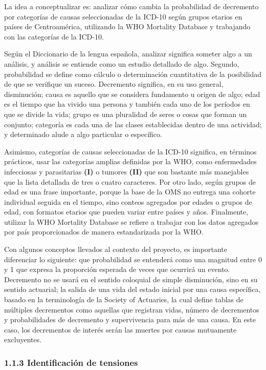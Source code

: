 \documentclass[
  letterpaper,
  DIV=11,
  numbers=noendperiod]{scrartcl}
\begin{document}
La idea a conceptualizar es: analizar cómo cambia la probabilidad de
decremento por categorías de causas seleccionadas de la ICD-10 según
grupos etarios en países de Centroamérica, utilizando la WHO Mortality
Database y trabajando con las categorías de la ICD-10.

Según el Diccionario de la lengua española, analizar significa someter
algo a un análisis, y análisis se entiende como un estudio detallado de
algo. Segundo, probabilidad se define como cálculo o determinación
cuantitativa de la posibilidad de que se verifique un suceso. Decremento
significa, en su uso general, disminución; causa es aquello que se
considera fundamento u origen de algo; edad es el tiempo que ha vivido
una persona y también cada uno de los períodos en que se divide la vida;
grupo es una pluralidad de seres o cosas que forman un conjunto;
categoría es cada una de las clases establecidas dentro de una
actividad; y determinado alude a algo particular o específico.

Asimismo, categorías de causas seleccionadas de la ICD-10 significa, en
términos prácticos, usar las categorías amplias definidas por la WHO,
como enfermedades infecciosas y parasitarias \textbf{(I)} o tumores
\textbf{(II)} que son bastante más manejables que la lista detallada de
tres o cuatro caracteres. Por otro lado, según grupos de edad es una
frase importante, porque la base de la OMS no entrega una cohorte
individual seguida en el tiempo, sino conteos agregados por edades o
grupos de edad, con formatos etarios que pueden variar entre países y
años. Finalmente, utilizar la WHO Mortality Database se refiere a
trabajar con los datos agregados por país proporcionados de manera
estandarizada por la WHO.

Con algunos conceptos llevados al contexto del proyecto, es importante
diferenciar lo siguiente: que probabilidad se entenderá como una
magnitud entre 0 y 1 que expresa la proporción esperada de veces que
ocurrirá un evento. Decremento no se usará en el sentido coloquial de
simple disminución, sino en su sentido actuarial; la salida de una vida
del estado inicial por una causa específica, basado en la terminología
de la Society of Actuaries, la cual define tablas de múltiples
decrementos como aquellas que registran vidas, número de decrementos y
probabilidades de decremento y supervivencia para más de una causa. En
este caso, los decrementos de interés serán las muertes por causas
mutuamente excluyentes.

\subsubsection{1.1.3 Identificación de
tensiones}\label{identificaciuxf3n-de-tensiones}
\end{document}
